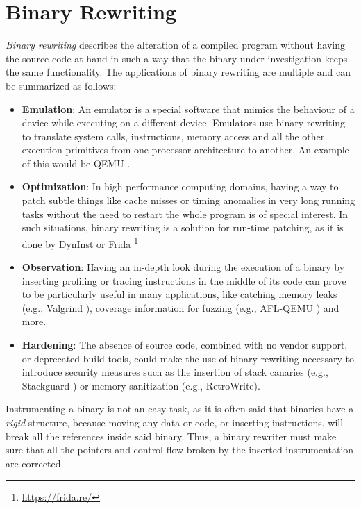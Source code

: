 \documentclass[a4paper,11pt,oneside]{report}
\newcommand{\sysname}{RetroWrite\xspace}
\begin{document}
\section{Binary Rewriting}
\emph{Binary rewriting} describes the alteration of a compiled program without 
having the source code at hand in such a way that the binary under 
investigation keeps the same functionality. The applications of binary 
rewriting are multiple and can be summarized as follows:
\begin{itemize}
	\item \textbf{Emulation}: An emulator is a special software that mimics the 
		behaviour of a device while executing on a different device. Emulators 
		use binary rewriting to translate system calls, instructions, memory 
		access and all the other execution primitives from one processor 
		architecture to another.  An example of this would be QEMU \cite{qemu}.

	\item \textbf{Optimization}: In high performance computing domains, having 
		a way to patch subtle things like cache misses or timing anomalies in 
		very long running tasks without the need to restart the whole program 
		is of special interest. In such situations, binary rewriting is a 
		solution for run-time patching, as it is done by DynInst \cite{dyninst} 
		or Frida \footnote{\url{https://frida.re/}}

	\item \textbf{Observation}: Having an in-depth look during the execution of 
		a binary by inserting profiling or tracing instructions in the middle 
		of its code can prove to be particularly useful in many applications, 
		like catching memory leaks (e.g., Valgrind \cite{valgrind}), coverage 
		information for fuzzing (e.g., AFL-QEMU \cite{afl}) and more.

	\item \textbf{Hardening}: The absence of source code, combined with no 
		vendor support, or deprecated build tools, could make the use of binary 
		rewriting necessary to introduce security measures such as the 
		insertion of stack canaries (e.g., Stackguard \cite{stackguard}) or 
		memory sanitization (e.g., \sysname \cite{dinesh20oakland}).
	
\end{itemize}

Instrumenting a binary is not an easy task, as it is often said that binaries 
have a \emph{rigid} structure, because moving any data or code, or inserting 
instructions, will break all the references inside said binary. Thus, a binary 
rewriter must make sure that all the pointers and control flow broken by the 
inserted instrumentation are corrected.
\end{document}
